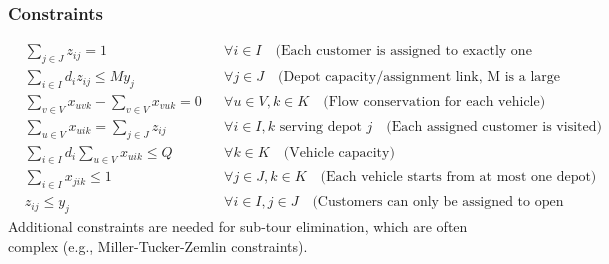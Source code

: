 \documentclass{article}
\begin{document}
\subsubsection{Constraints}
\begin{align}
& \sum_{j \in J} z_{ij} = 1 && \forall i \in I \quad \text{(Each customer is assigned to exactly one depot)} \\
& \sum_{i \in I} d_i z_{ij} \leq M y_j && \forall j \in J \quad \text{(Depot capacity/assignment link, M is a large number)} \\
& \sum_{v \in V} x_{uvk} - \sum_{v \in V} x_{vuk} = 0 && \forall u \in V, k \in K \quad \text{(Flow conservation for each vehicle)} \\
& \sum_{u \in V} x_{uik} = \sum_{j \in J} z_{ij} && \forall i \in I, k \text{ serving depot } j \quad \text{(Each assigned customer is visited)} \\
& \sum_{i \in I} d_i \sum_{u \in V} x_{uik} \leq Q && \forall k \in K \quad \text{(Vehicle capacity)} \\
& \sum_{i \in I} x_{jik} \leq 1 && \forall j \in J, k \in K \quad \text{(Each vehicle starts from at most one depot)} \\
& z_{ij} \leq y_j && \forall i \in I, j \in J \quad \text{(Customers can only be assigned to open depots)}
\end{align}
Additional constraints are needed for sub-tour elimination, which are often complex (e.g., Miller-Tucker-Zemlin constraints).
\end{document}
